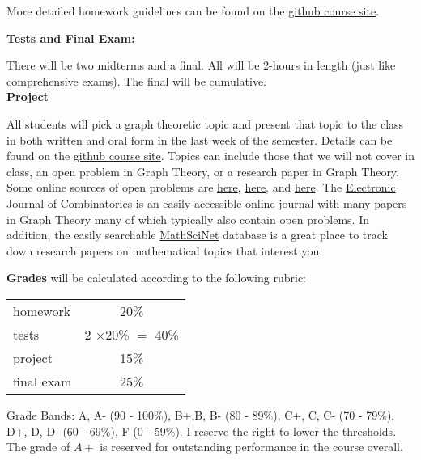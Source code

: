 \documentclass[12pt]{article}
\begin{document}
More detailed homework guidelines can be found on the \href{https://jrfaudree.github.io/M663f23/}{github course site}.


{\textbf{\large{Tests and Final Exam:}}}

There will be two midterms and a final. All will be 2-hours in length (just like comprehensive exams). The final will be cumulative.\\

{\textbf{\large{Project}}}

All students will pick a graph theoretic topic and present that topic to the class in both written and oral form in the last week of the semester. Details can be found on the \href{https://jrfaudree.github.io/M663f23/}{github course site}. Topics can include those that we will not cover in class, an open problem in Graph Theory, or a research paper in Graph Theory.  Some online sources of open problems are \href{http://www.openproblemgarden.org/category/graph_theory}{here}, \href{https://faculty.math.illinois.edu/~west/openp/}{here}, and \href{http://dimacs.rutgers.edu/~hochberg/undopen/graphtheory/graphtheory.html}{here}. The \href{https://www.combinatorics.org/}{Electronic Journal of Combinatorics} is an easily accessible online journal with many papers in Graph Theory many of which typically also contain open problems. In addition, the easily searchable  \href{https://mathscinet.ams.org/mathscinet}{MathSciNet} database is a great place to track down research papers on mathematical topics that interest you.

\textbf{Grades} will be calculated according to the following rubric:

\begin{tabular}{|l|c|}
  \hline
  homework & 20\% \\
  tests & 2 $\times$20\% $=$ 40\%\\
  project & 15\%\\
  final exam & 25\% \\
  \hline
\end{tabular}

Grade Bands: A, A- (90 - 100\%), B+,B, B- (80 - 89\%), C+, C, C- (70 - 79\%), D+, D, D-
(60 - 69\%), F (0 - 59\%).  I reserve the right to lower the thresholds. The grade of $A+$ is reserved for outstanding performance in the course overall.\\

\newpage
\end{document}
